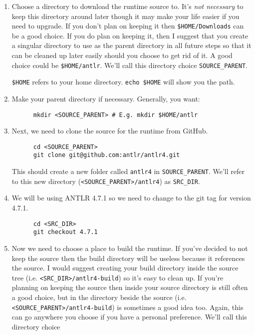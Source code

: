 \documentclass[../setup.tex]{subfiles}
\begin{document}
\begin{enumerate}
  \item
    Choose a directory to download the runtime source to. It's \emph{not necessary} to keep this
    directory around later though it may make your life easier if you need to upgrade. If you don't
    plan on keeping it then \lstinline{$HOME/Downloads} can be a good choice. If you do plan on
    keeping it, then I suggest that you create a singular directory to use as the parent directory
    in all future steps so that it can be cleaned up later easily should you choose to get rid of
    it. A good choice could be \lstinline{$HOME/antlr}. We'll call this directory choice
    \lstinline{SOURCE_PARENT}.

    \lstinline{$HOME} refers to your home directory. \lstinline{echo $HOME} will show you the path.
  \item
    Make your parent directory if necessary. Generally, you want:
    \begin{lstlisting}
      mkdir <SOURCE_PARENT> # E.g. mkdir $HOME/antlr
    \end{lstlisting}
  \item
    Next, we need to clone the source for the runtime from GitHub.
    \begin{lstlisting}
      cd <SOURCE_PARENT>
      git clone git@github.com:antlr/antlr4.git
    \end{lstlisting}
    This should create a new folder called \lstinline{antlr4} in \lstinline{SOURCE_PARENT}. We'll
    refer to this new directory (\lstinline{<SOURCE_PARENT>/antlr4}) as \lstinline{SRC_DIR}.
  \item
    We will be using ANTLR 4.7.1 so we need to change to the git tag for version 4.7.1.
    \begin{lstlisting}
      cd <SRC_DIR>
      git checkout 4.7.1
    \end{lstlisting}
  \item
    Now we need to choose a place to build the runtime. If you've decided to not keep the source
    then the build directory will be useless because it references the source. I would suggest
    creating your build directory inside the source tree (i.e. \lstinline{<SRC_DIR>/antlr4-build})
    so it's easy to clean up. If you're planning on keeping the source then inside your source
    directory is still often a good choice, but in the directory beside the source (i.e.
    \lstinline{<SOURCE_PARENT>/antlr4-build}) is sometimes a good idea too. Again, this can go
    anywhere you choose if you have a personal preference. We'll call this directory choice

\end{enumerate}
\end{document}

